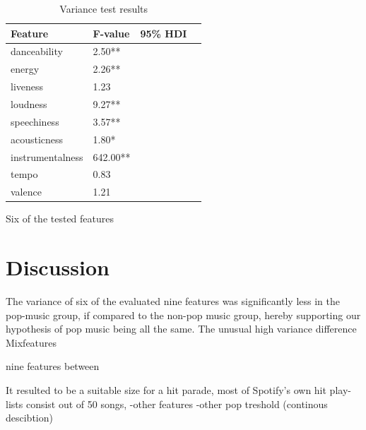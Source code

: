 \documentclass{article}
\begin{document}
\begin{table}[h!]
  \caption{Variance test results}
  \label{tab:var}
  \centering
  \begin{tabular}{lllc}
    \toprule
    Feature     & F-value & 95\% HDI\\
    \midrule
	danceability        	&  2.50** &\\
	energy              		&  2.26** &\\
	liveness            		&  1.23   &\\
	loudness            	&  9.27** &\\
	speechiness         	&  3.57** &\\
	acousticness        	&  1.80*  &\\
	instrumentalness    	&642.00** &\\
	tempo               		&  0.83   &\\
	valence             	&  1.21   &\\
    \bottomrule
  \end{tabular}
\end{table}



Six of the tested features  %

\section{Discussion}
The variance of six of the evaluated nine features was significantly less in the pop-music group, if compared to the non-pop music group, hereby supporting our hypothesis of pop music being all the same.  
The unusual high variance difference 
Mixfeatures


nine features between 


 It resulted  to be a suitable size for a hit parade, most of Spotify's own hit play-lists consist out of 50 songs, 
-other features
-other pop treshold (continous descibtion)




\end{document}

